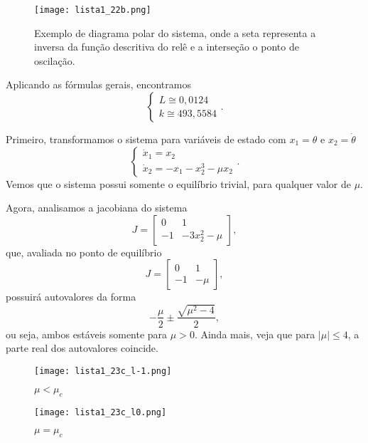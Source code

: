 \documentclass[a4paper]{report}
\begin{document}

\begin{figure}[H]
    \centering
    \texttt{[image: lista1\_22b.png]}
    \caption{Exemplo de diagrama polar do sistema, onde a seta representa a inversa da função descritiva do relê e a interseção o ponto de oscilação.}
    \label{fig:lista1_22b-png}
\end{figure}


Aplicando as fórmulas gerais, encontramos \[
\begin{cases}
    L \cong 0,0124 \\
    k \cong 493,5584
\end{cases}
.\]



Primeiro, transformamos o sistema para variáveis de estado com $x_1 = \theta$ e $x_2 = \dot{\theta}$ \[
\begin{cases}
    \dot{x}_1 = x_2 \\
    \dot{x}_2 = -x_1 - x_2^3 -\mu x_2 
\end{cases}
.\] Vemos que o sistema possui somente o equilíbrio trivial, para qualquer valor de $\mu$.

Agora, analisamos a jacobiana do sistema  \[
J = \begin{bmatrix} 
    0 & 1 \\
    -1 & -3x_2^2 -\mu
\end{bmatrix} 
,\] que, avaliada no ponto de equilíbrio \[
J = \begin{bmatrix} 
    0 & 1 \\
    -1 & -\mu
\end{bmatrix} 
,\] possuirá autovalores da forma \[
-\frac{\mu}{2} \pm \frac{\sqrt{\mu^2 -4} }{2}
,\] ou seja, ambos estáveis somente para $\mu>0$. Ainda mais, veja que para $|\mu| \le 4$, a parte real dos autovalores coincide.



\begin{figure}[H]
    \centering
    \texttt{[image: lista1\_23c\_l-1.png]}
    \caption{$\mu<\mu_c$}
    \label{fig:lista1_23c_l-1-png}
\end{figure}

\begin{figure}[H]
    \centering
    \texttt{[image: lista1\_23c\_l0.png]}
    \caption{$\mu=\mu_c$}
    \label{fig:lista1_23c_l-1-png}
\end{figure}
\end{document}
